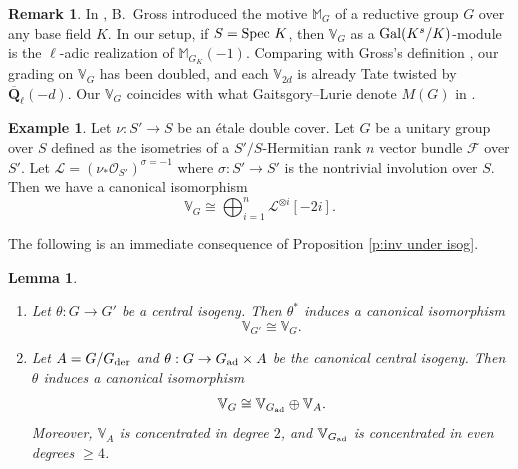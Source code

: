 \documentclass[reqno]{amsart}
\numberwithin{equation}{subsection}
\newtheorem{lemma}[subsubsection]{Lemma}
\theoremstyle{definition}
\newtheorem{remark}[subsubsection]{Remark}
\newtheorem{exam}[subsubsection]{Example}
\def\GG{\mathbb{G}}
\def\MM{\mathbb{M}}
\def\VV{\mathbb{V}}
\def\ZZ{\mathbb{Z}}
\newcommand\cF{\mathcal{F}}
\newcommand\cL{\mathcal{L}}
\newcommand\cO{\mathcal{O}}
\newcommand\Gal{\textup{Gal}}
\newcommand{\Gr}{\textup{Gr}}
\newcommand\Spec{\textup{Spec}\ }
\newcommand{\ad}{\textup{ad}}
\newcommand{\der}{\textup{der}}
\newcommand{\Qlbar}{\overline{\Q}_\ell}
\newcommand\op{\oplus}
\newcommand\ot{\otimes}
\renewcommand{\th}{\theta}
\newcommand{\s}{\sigma}
\newcommand\aug{\textup{aug}}
\newcommand{\Q}{\mathbf{Q}}
\begin{document}
\begin{remark}In \cite{Gro97}, B.~Gross introduced the motive $\MM_{G}$ of a reductive group $G$ over any base field $K$. In our setup, if $S=\Spec K$, then $\VV_{G}$ as a $\Gal(K^{s}/K)$-module is the $\ell$-adic realization of $\MM_{G_{K}}(-1)$. Comparing with Gross's definition \cite[(1.5)]{Gro97}, our grading on $\VV_{G}$ has been doubled, and each $\VV_{2d}$ is already Tate twisted by $\Qlbar(-d)$. 
Our $\VV_G$ coincides with what Gaitsgory--Lurie denote $M(G)$ in \cite[Remark 6.4.10]{GL14}.
\end{remark}




\begin{exam} Let $\nu: S'\to S$ be an \'etale double cover. Let $G$ be a unitary group over $S$ defined as the isometries of a $S'/S$-Hermitian rank $n$ vector bundle $\cF$ over $S'$. Let $\cL=(\nu_{*}\cO_{S'})^{\s=-1}$ where $\s:S'\to S'$ is the nontrivial involution over $S$. Then we have a canonical isomorphism 
\begin{equation*}
\VV_{G}\cong \bigoplus_{i=1}^{n}\cL^{\ot i}[-2i].
\end{equation*}
\end{exam}


The following is an immediate consequence of Proposition \ref{p:inv under isog}.

\begin{lemma}\label{l:V under isog}
\begin{enumerate}
\item Let $\th: G\to G'$ be a central isogeny. Then $\th^{*}$ induces a canonical isomorphism
\begin{equation*}
\VV_{G'}\cong \VV_{G}.
\end{equation*}

\item Let $A=G/G_{\der}$ and $\th: G\to G_{\ad}\times A$ be the canonical central isogeny. Then $\th$ induces a canonical isomorphism
\begin{equation*}
\VV_{G}\cong \VV_{G_{\ad}}\op \VV_{A}.
\end{equation*}
Moreover, $\VV_{A}$ is concentrated in degree $2$, and $\VV_{G_{\ad}}$ is concentrated in even degrees $\ge4$.
\end{enumerate}
\end{lemma}
\end{document}
